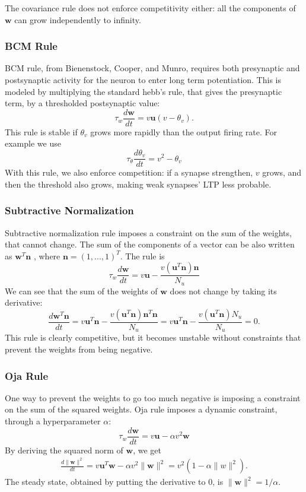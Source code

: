 \documentclass[oneside]{book}
\renewcommand{\u}{\mathbf{u}}
\newcommand{\w}{\mathbf{w}}
\theoremstyle{definition}
\theoremstyle{plain}
\begin{document}
The covariance rule does not enforce competitivity either: all the components of $\w$ can grow independently to infinity.

\subsubsection*{BCM Rule}

BCM rule, from Bienenstock, Cooper, and Munro, requires both presynaptic and postsynaptic activity for the neuron to enter long term potentiation. This is modeled by multiplying the standard hebb's rule, that gives the presynaptic term, by a thresholded postsynaptic value:
\begin{equation}
    \tau_w\frac{d\w}{dt} = v\u(v-\theta_v).
\end{equation}
This rule is stable if $\theta_v$ grows more rapidly than the output firing rate. For example we use 
\begin{equation}
    \tau_\theta \frac{d\theta_v}{dt} = v^2-\theta_v
\end{equation}
With this rule, we also enforce competition: if a synapse strengthen, $v$ grows, and then the threshold also grows, making weak synapses' LTP less probable.

\subsubsection*{Subtractive Normalization}
Subtractive normalization rule imposes a constraint on the sum of the weights, that cannot change.  The sum of the components of a vector can be also written as $\w^T\mathbf{n}$ , where $\mathbf{n} = (1,...,1)^T$. The rule is
\begin{equation}
    \tau_w\frac{d\w}{dt} =v\u- \frac{v(\u^T\mathbf{n})\mathbf{n}}{N_u}
\end{equation}
We can see that the sum of the weights of $\w$ does not change by taking its derivative:
\[
    \frac{d\w^T\mathbf{n}}{dt} = v\u^T\mathbf{n} - \frac{v(\u^T\mathbf{n})\mathbf{n}^T\mathbf{n}}{N_u}
    = v\u^T\mathbf{n} - \frac{v(\u^T\mathbf{n})N_u}{N_u} =0.
\]
This rule is clearly competitive, but it becomes unstable without constraints that prevent the weights from being negative.
\subsubsection{Oja Rule}
One way to prevent the weights to go too much negative is imposing a constraint on the sum of the squared weights.
Oja rule imposes a dynamic constraint, through a hyperparameter $\alpha$:
\begin{equation}
    \tau_w\frac{d\w}{dt} = v\u -\alpha v^2\w
\end{equation}
By deriving the squared norm of $\w$, we get
\begin{align*}
    \frac{d\|\w\|^2}{dt} = v\u^T\w - \alpha v^2 \|\w\|^2  = v^2(1-\alpha \|w\|^2).
\end{align*}
The steady state, obtained by putting the derivative to 0, is $\|\w\|^2 = 1/\alpha$.
\end{document}
